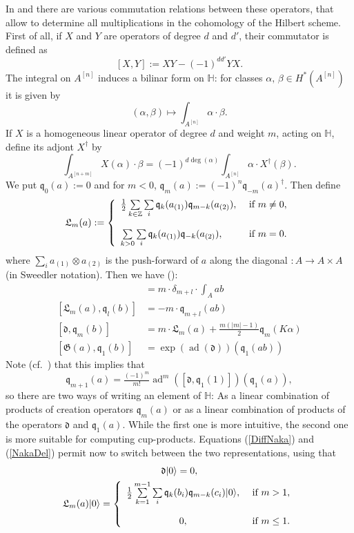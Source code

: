 \documentclass{amsart}
\DeclareMathOperator{\ad}{ad}
\newcommand{\hilb}[1]{^{[#1]}}
\newcommand{\vac}{|0\rangle}
\newcommand{\G}{\mathfrak{G}}
\newcommand{\q}{\mathfrak{q}}
\renewcommand{\H}{\mathbb{H}}
\newcommand{\Z}{\mathbb{Z}}
\theoremstyle{plain}
\theoremstyle{definition}
\theoremstyle{remark}
\begin{document}
In \cite{LehnSorger} and \cite{LiQinWang} there are various commutation relations between these operators, that allow to determine all multiplications in the cohomology of the Hilbert scheme. First of all, if $X$ and $Y$ are operators of degree $d$ and $d'$, their commutator is defined as 
$$
[X,Y] := XY - (-1)^{dd'}YX.
$$
The integral on $A\hilb{n}$ induces a bilinar form on $\H$: for classes $\alpha,\,\beta\in H^*(A\hilb{n})$ it is given by
$$
(\alpha,\beta) \longmapsto \int_{A\hilb{n}}\alpha\cdot\beta.
$$
If $X$ is a homogeneous linear operator of degree $d$ and weight $m$, acting on $\H$, define its adjont $X^\dagger$ by
$$
\int_{A\hilb{n+m}}X(\alpha)\cdot\beta = (-1)^{d\deg(\alpha)}\int_{A\hilb{n}} \alpha \cdot X^\dagger (\beta).
$$
We put $\q_0(a) :=0$ and for $m<0$, $\q_m(a) := (-1)^n \q_{-m}(a)^\dagger$. Then define
$$
\mathfrak{L}_m(a) := \left\{ 
\begin{array}{ll}
 \tfrac{1}{2}\sum\limits_{k\in\Z}\sum\limits_{i}\q_k( a_{(1)})\q_{m-k}( a_{(2)}), & \text{ if } m\neq 0, \vspace{4mm}\\
 \sum\limits_{k>0}\sum\limits_{i}\q_k( a_{(1)})\q_{-k}( a_{(2)}), & \text{ if } m= 0. \\
\end{array}
\right.
$$
where $\sum_i a_{(1)}\otimes  a_{(2)}$ is the push-forward of $a$ along the diagonal $:A \rightarrow A\times A$ (in Sweedler notation).
Then we have (\cite[Thm.~2.16]{LiQinWang}):
\begin{align}
[\q_m(a), \q_l(b)] &= m\cdot \delta_{m+l} \cdot \int_A ab \\
[\mathfrak{L}_m(a),\q_l(b)] &= -m\cdot \q_{m+l}(ab) \\
\label{DiffNaka}
[\mathfrak{d},\q_m(b)] &= m \cdot \mathfrak{L}_m(a) + \tfrac{m(|m|-1)}{2} \q_m(K\alpha) \\
[\G(a),\q_1(b)] &= \exp(\ad(\mathfrak{d}))(\q_1(a b) )
\end{align}
Note (cf.~\cite[Thm.~3.8]{LehnSorger}) that this implies that 
\begin{equation}\label{NakaDel}
\q_{m+1}(a) = \tfrac{(-1)^m}{m!}\ad^m([\mathfrak{d},\q_1(1)])(\q_1(a)),
\end{equation}
so there are two ways of writing an element of $\H$: As a linear combination of products of creation operators $\q_m(a)$ or as a linear combination of products of the operators $\mathfrak{d}$ and $\q_1(a)$. While the first one is more intuitive, the second one is more suitable for computing cup-products. 
Equations (\ref{DiffNaka}) and (\ref{NakaDel}) permit now to switch between the two representations, using that
\begin{gather}
\mathfrak{d} \vac = 0 ,  \\
\mathfrak{L}_m(a) \vac = \left\{ 
\begin{array}{cl}
 \tfrac{1}{2}\sum\limits_{k=1}^{m-1}\sum\limits_{i}\q_k(b_i)\q_{m-k}(c_i)\vac, & \text{ if } m>1, \vspace{4mm}\\
 0, & \text{ if } m\leq 1. \\
\end{array}
\right.\\
\end{gather}
\end{document}
